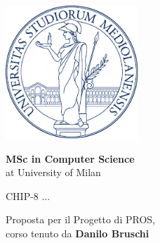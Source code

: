 \documentclass[a4paper]{article}
\begin{document}


\begin{titlepage}
    \begin{center}
        \includegraphics[height=5cm]{minerva.pdf} %

        \vspace*{1.75cm}

        \LARGE


        \textbf{MSc in Computer Science} \\
        at University of Milan

        \vspace*{1cm}

        
        \huge
        CHIP-8 ...

        \large Proposta per il Progetto di PROS, \\
               corso tenuto da \textbf{Danilo Bruschi}
        

        \normalsize
        \vspace*{4cm}


\end{center}
\end{titlepage}
\end{document}
